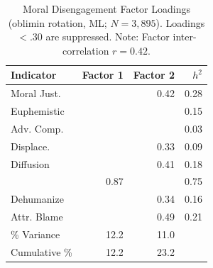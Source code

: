 \begin{table}[ht]
\centering
\caption{Moral Disengagement Factor Loadings (oblimin rotation, ML; $N = 3,895$). Loadings $< .30$ are suppressed. Note: Factor inter-correlation $r = 0.42$.} 
\label{tab:fa_md}
\begin{tabular}{lrrr}
  \toprule
Indicator & Factor 1 & Factor 2 & $h^2$ \\ 
  \midrule
Moral Just. &  & 0.42 & 0.28 \\ 
  Euphemistic &  &  & 0.15 \\ 
  Adv. Comp. &  &  & 0.03 \\ 
  Displace. &  & 0.33 & 0.09 \\ 
  Diffusion &  & 0.41 & 0.18 \\ 
   & 0.87 &  & 0.75 \\ 
  Dehumanize &  & 0.34 & 0.16 \\ 
  Attr. Blame &  & 0.49 & 0.21 \\ 
   \midrule
\% Variance & 12.2 & 11.0 &  \\ 
  Cumulative \% & 12.2 & 23.2 &  \\ 
   \bottomrule
\end{tabular}
\end{table}
